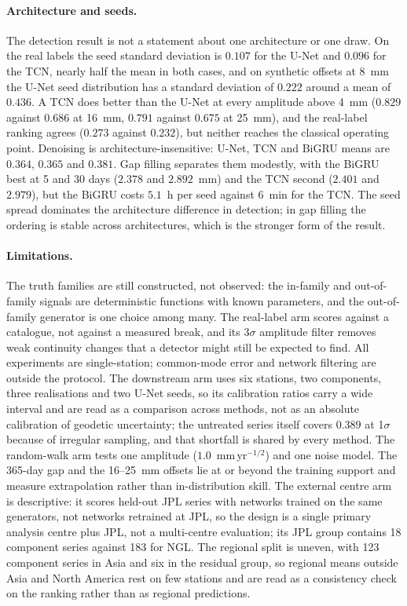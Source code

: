 \paragraph{Architecture and seeds.}
The detection result is not a statement about one architecture or one draw. On
the real labels the seed standard deviation is $0.107$ for the U-Net and
$0.096$ for the TCN, nearly half the mean in both cases, and on synthetic
offsets at 8~mm the U-Net seed distribution has a standard deviation of $0.222$
around a mean of $0.436$. A TCN does better than the U-Net at every amplitude
above 4~mm ($0.829$ against $0.686$ at 16~mm, $0.791$ against $0.675$ at
25~mm), and the real-label ranking agrees ($0.273$ against $0.232$), but neither
reaches the classical operating point. Denoising is architecture-insensitive:
U-Net, TCN and BiGRU means are $0.364$, $0.365$ and $0.381$. Gap filling
separates them modestly, with the BiGRU best at 5 and 30 days ($2.378$ and
$2.892$~mm) and the TCN second ($2.401$ and $2.979$), but the BiGRU costs
$5.1$~h per seed against $6$~min for the TCN. The seed spread dominates the
architecture difference in detection; in gap filling the ordering is stable
across architectures, which is the stronger form of the result.

\paragraph{Limitations.}
The truth families are still constructed, not observed: the in-family and
out-of-family signals are deterministic functions with known parameters, and the
out-of-family generator is one choice among many. The real-label arm scores
against a catalogue, not against a measured break, and its 3$\sigma$ amplitude
filter removes weak continuity changes that a detector might still be expected
to find. All experiments are single-station; common-mode error and network
filtering are outside the protocol. The downstream arm uses six stations, two
components, three realisations and two U-Net seeds, so its calibration ratios
carry a wide interval and are read as a comparison across methods, not as an
absolute calibration of geodetic uncertainty; the untreated series itself covers
$0.389$ at 1$\sigma$ because of irregular sampling, and that shortfall is shared
by every method. The random-walk arm tests one amplitude ($1.0$~mm\,yr$^{-1/2}$)
and one noise model. The 365-day gap and the 16--25~mm offsets lie at or beyond
the training support and measure extrapolation rather than in-distribution
skill. The external centre arm is descriptive: it scores held-out JPL series
with networks trained on the same generators, not networks retrained at JPL,
so the design is a single primary analysis centre plus JPL, not a multi-centre
evaluation; its JPL group contains 18 component series against 183 for NGL. The
regional split is uneven, with 123 component series in Asia and six in the
residual group, so regional means outside Asia and North America rest on few
stations and are read as a consistency check on the ranking rather than as
regional predictions.
